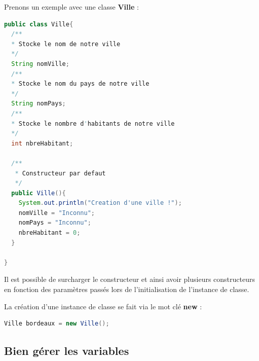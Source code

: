 \documentclass[a4paper,twoside]{article}
\begin{document}
Prenons un exemple avec une classe \textbf{Ville} :
\begin{lstlisting}[language=java]
public class Ville{
  /**
  * Stocke le nom de notre ville
  */
  String nomVille;
  /**
  * Stocke le nom du pays de notre ville
  */
  String nomPays;
  /**
  * Stocke le nombre d'habitants de notre ville
  */
  int nbreHabitant;
 
  /**
   * Constructeur par defaut
   */
  public Ville(){
    System.out.println("Creation d'une ville !");      
    nomVille = "Inconnu";
    nomPays = "Inconnu";
    nbreHabitant = 0;
  }
 
}
\end{lstlisting}

\begin{remarque}
Il est possible de surcharger  le constructeur et ainsi avoir plusieurs constructeurs en fonction des paramètres passés lors de l'initialisation de l'instance de classe.
\end{remarque}

\bigskip

La création d'une instance de classe se fait via le mot clé \textbf{new} :
\begin{lstlisting}[language=java]
Ville bordeaux = new Ville();
\end{lstlisting}

\subsection{Bien gérer les variables}\label{sec:good_behavior}
\end{document}
